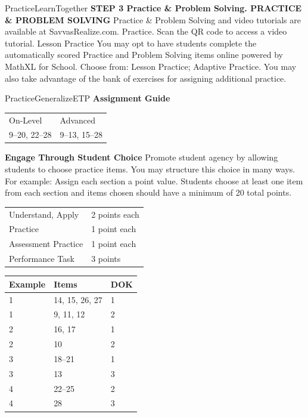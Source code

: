 \documentclass{article}
\newenvironment{item-analysis}{}{}      %
\newenvironment{te-addendum}[2]{}{}     %
\begin{document}
\begin{te-addendum}{Practice}{LearnTogether}
\textbf{STEP 3 Practice \& Problem Solving. PRACTICE \& PROBLEM SOLVING}
Practice \& Problem Solving and video tutorials are available at SavvasRealize.com. Practice. Scan the QR code to access a video tutorial.
Lesson Practice You may opt to have students complete the automatically scored Practice and Problem Solving items online powered by MathXL for School.
Choose from: Lesson Practice; Adaptive Practice.
You may also take advantage of the bank of exercises for assigning additional practice.
\end{te-addendum}
\begin{te-addendum}{Practice}{GeneralizeETP}
\textbf{Assignment Guide}
\begin{tabular}{ll}
On-Level & Advanced \\
9--20, 22--28 & 9--13, 15--28 \\
\end{tabular}
\textbf{Engage Through Student Choice}
Promote student agency by allowing students to choose practice items. You may structure this choice in many ways.
For example:
Assign each section a point value. Students choose at least one item from each section and items chosen should have a minimum of 20 total points.
\begin{tabular}{ll}
Understand, Apply & 2 points each \\
Practice & 1 point each \\
Assessment Practice & 1 point each \\
Performance Task & 3 points \\
\end{tabular}
\end{te-addendum}
\begin{item-analysis}
\begin{tabular}{lll}
\toprule
Example & Items & DOK \\
\midrule
1 & 14, 15, 26, 27 & 1 \\
1 & 9, 11, 12 & 2 \\
2 & 16, 17 & 1 \\
2 & 10 & 2 \\
3 & 18--21 & 1 \\
3 & 13 & 3 \\
4 & 22--25 & 2 \\
4 & 28 & 3 \\
\bottomrule
\end{tabular}
\end{item-analysis}
\end{document}
